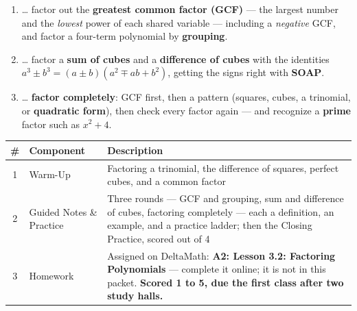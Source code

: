 \documentclass[12pt]{article}
\begin{document}

\namedateperiod
\vspace{0.18in}

\boxguard[14]
\begin{learningtargetbox}
\small
\begin{enumerate}[leftmargin=1.5em, itemsep=5pt]
  \item \ldots{} factor out the \textbf{greatest common factor (GCF)} --- the largest number and
        the \emph{lowest} power of each shared variable --- including a \emph{negative} GCF, and
        factor a four-term polynomial by \textbf{grouping}.
  \item \ldots{} factor a \textbf{sum of cubes} and a \textbf{difference of cubes} with the
        identities $a^3\pm b^3=(a\pm b)(a^2\mp ab+b^2)$, getting the signs right with
        \textbf{SOAP}.
  \item \ldots{} \textbf{factor completely}: GCF first, then a pattern (squares, cubes, a
        trinomial, or \textbf{quadratic form}), then check every factor again --- and recognize a
        \textbf{prime} factor such as $x^2+4$.
\end{enumerate}
\end{learningtargetbox}

\vspace{0.14in}

\boxguard[14]
\begin{tocbox}
\small
\renewcommand{\arraystretch}{1.5}
\begin{tabularx}{\linewidth}{@{} c l X @{}}
\rowcolor{forestbg}
\textbf{\#} & \textbf{Component} & \textbf{Description} \\
\midrule
1 & Warm-Up & Factoring a trinomial, the difference of squares, perfect cubes, and a common
              factor \\
2 & Guided Notes \& Practice & Three rounds --- GCF and grouping, sum and difference of cubes,
              factoring completely --- each a definition, an example, and a practice ladder; then
              the Closing Practice, scored out of 4 \\
3 & Homework & Assigned on DeltaMath: \textbf{A2: Lesson 3.2: Factoring Polynomials} --- complete it
              online; it is not in this packet. \textbf{Scored 1 to 5, due the first class after
              two study halls.} \\
\end{tabularx}
\end{tocbox}
\end{document}
